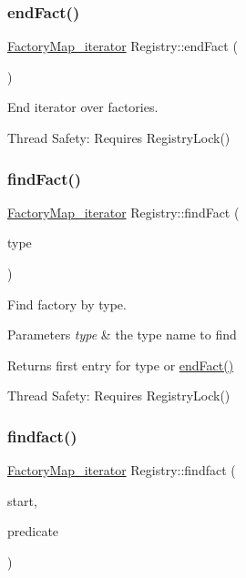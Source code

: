 \subsubsection{\texorpdfstring{end\+Fact()}{endFact()}}
{\footnotesize\ttfamily \hyperlink{classtheoria_1_1core_1_1Registry_ae131721f32d396fad4d2d48b0438dca1}{Factory\+Map\+\_\+iterator} Registry\+::end\+Fact (\begin{DoxyParamCaption}{ }\end{DoxyParamCaption})}

End iterator over factories.

Thread Safety\+: Requires Registry\+Lock() \mbox{\label{classtheoria_1_1core_1_1Registry_a54ee3016a6f14b3bedfecd3566caf0b5}} 
\subsubsection{\texorpdfstring{find\+Fact()}{findFact()}}
{\footnotesize\ttfamily \hyperlink{classtheoria_1_1core_1_1Registry_ae131721f32d396fad4d2d48b0438dca1}{Factory\+Map\+\_\+iterator} Registry\+::find\+Fact (\begin{DoxyParamCaption}\item[{const Type\+Name \&}]{type }\end{DoxyParamCaption})}

Find factory by type. 
\begin{DoxyParams}{Parameters}
{\em type} & the type name to find \\
\hline
\end{DoxyParams}
\begin{DoxyReturn}{Returns}
first entry for type or \hyperlink{classtheoria_1_1core_1_1Registry_ac88948c696663ae6f7ba3ece5c2fdcc9}{end\+Fact()}
\end{DoxyReturn}
Thread Safety\+: Requires Registry\+Lock() \mbox{\label{classtheoria_1_1core_1_1Registry_a044928d257bed09b8c288c41e5c95a26}} 
\subsubsection{\texorpdfstring{findfact()}{findfact()}}
{\footnotesize\ttfamily \hyperlink{classtheoria_1_1core_1_1Registry_ae131721f32d396fad4d2d48b0438dca1}{Factory\+Map\+\_\+iterator} Registry\+::findfact (\begin{DoxyParamCaption}\item[{Factory\+Map\+::iterator}]{start,  }\item[{bool($\ast$)(Factory\+Map\+::value\+\_\+type \&v)}]{predicate }\end{DoxyParamCaption})}

